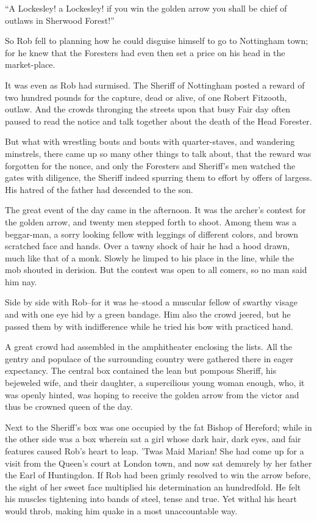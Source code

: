 ``A Lockesley! a Lockesley! if you win the golden arrow you shall be
chief of outlaws in Sherwood Forest!''

So Rob fell to planning how he could disguise himself to go to
Nottingham town; for he knew that the Foresters had even then set a
price on his head in the market-place.

It was even as Rob had surmised. The Sheriff of Nottingham posted a
reward of two hundred pounds for the capture, dead or alive, of one
Robert Fitzooth, outlaw. And the crowds thronging the streets upon that
busy Fair day often paused to read the notice and talk together about
the death of the Head Forester.

But what with wrestling bouts and bouts with quarter-staves, and
wandering minstrels, there came up so many other things to talk about,
that the reward was forgotten for the nonce, and only the Foresters and
Sheriff's men watched the gates with diligence, the Sheriff indeed
spurring them to effort by offers of largess. His hatred of the father
had descended to the son.

The great event of the day came in the afternoon. It was the archer's
contest for the golden arrow, and twenty men stepped forth to shoot.
Among them was a beggar-man, a sorry looking fellow with leggings of
different colors, and brown scratched face and hands. Over a tawny shock
of hair he had a hood drawn, much like that of a monk. Slowly he limped
to his place in the line, while the mob shouted in derision. But the
contest was open to all comers, so no man said him nay.

Side by side with Rob--for it was he--stood a muscular fellow of swarthy
visage and with one eye hid by a green bandage. Him also the crowd
jeered, but he passed them by with indifference while he tried his bow
with practiced hand.

A great crowd had assembled in the amphitheater enclosing the lists. All
the gentry and populace of the surrounding country were gathered there
in eager expectancy. The central box contained the lean but pompous
Sheriff, his bejeweled wife, and their daughter, a supercilious young
woman enough, who, it was openly hinted, was hoping to receive the
golden arrow from the victor and thus be crowned queen of the day.

Next to the Sheriff's box was one occupied by the fat Bishop of
Hereford; while in the other side was a box wherein sat a girl whose
dark hair, dark eyes, and fair features caused Rob's heart to leap.
'Twas Maid Marian! She had come up for a visit from the Queen's court at
London town, and now sat demurely by her father the Earl of Huntingdon.
If Rob had been grimly resolved to win the arrow before, the sight of
her sweet face multiplied his determination an hundredfold. He felt his
muscles tightening into bands of steel, tense and true. Yet withal his
heart would throb, making him quake in a most unaccountable way.

